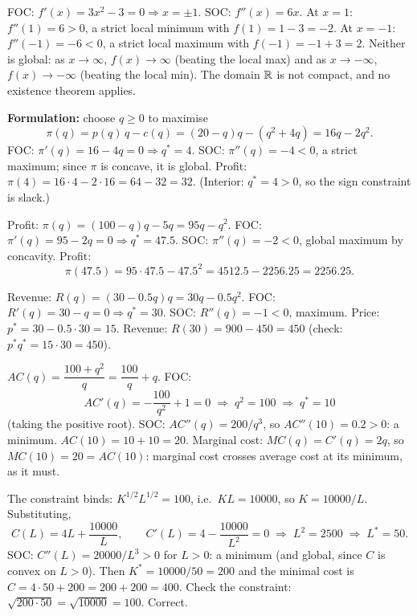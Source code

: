 \begin{solutions}
  \item FOC: $f'(x)=3x^{2}-3=0 \Rightarrow x=\pm 1$. SOC:
        $f''(x)=6x$. At $x=1$: $f''(1)=6>0$, a strict local minimum
        with $f(1)=1-3=-2$. At $x=-1$: $f''(-1)=-6<0$, a strict local
        maximum with $f(-1)=-1+3=2$. Neither is global: as
        $x\to\infty$, $f(x)\to\infty$ (beating the local max) and as
        $x\to-\infty$, $f(x)\to-\infty$ (beating the local min). The
        domain $\mathbb{R}$ is not compact, and no existence theorem applies.

  \item \textbf{Formulation:} choose $q\ge 0$ to maximise
        \[
          \pi(q)=p(q)\,q-c(q)=(20-q)q-(q^{2}+4q)=16q-2q^{2}.
        \]
        FOC: $\pi'(q)=16-4q=0 \Rightarrow q^{*}=4$. SOC:
        $\pi''(q)=-4<0$, a strict maximum; since $\pi$ is concave, it
        is global. Profit:
        $\pi(4)=16\cdot 4-2\cdot 16=64-32=32$. (Interior: $q^{*}=4>0$,
        so the sign constraint is slack.)

  \item Profit: $\pi(q)=(100-q)q-5q=95q-q^{2}$. FOC:
        $\pi'(q)=95-2q=0 \Rightarrow q^{*}=47.5$. SOC:
        $\pi''(q)=-2<0$, global maximum by concavity. Profit:
        \[
          \pi(47.5)=95\cdot 47.5-47.5^{2}=4512.5-2256.25=2256.25 .
        \]

  \item Revenue: $R(q)=(30-0.5q)q=30q-0.5q^{2}$. FOC:
        $R'(q)=30-q=0 \Rightarrow q^{*}=30$. SOC: $R''(q)=-1<0$,
        maximum. Price: $p^{*}=30-0.5\cdot 30=15$. Revenue:
        $R(30)=900-450=450$ (check: $p^{*}q^{*}=15\cdot 30=450$).

  \item $AC(q)=\dfrac{100+q^{2}}{q}=\dfrac{100}{q}+q$. FOC:
        \[
          AC'(q)=-\frac{100}{q^{2}}+1=0
          \;\Rightarrow\; q^{2}=100 \;\Rightarrow\; q^{*}=10
        \]
        (taking the positive root). SOC:
        $AC''(q)=200/q^{3}$, so $AC''(10)=0.2>0$: a minimum.
        $AC(10)=10+10=20$. Marginal cost: $MC(q)=C'(q)=2q$, so
        $MC(10)=20=AC(10)$: marginal cost crosses average cost at
        its minimum, as it must.

  \item The constraint binds: $K^{1/2}L^{1/2}=100$, i.e.\
        $KL=10000$, so $K=10000/L$. Substituting,
        \[
          C(L)=4L+\frac{10000}{L}, \qquad
          C'(L)=4-\frac{10000}{L^{2}}=0
          \;\Rightarrow\; L^{2}=2500 \;\Rightarrow\; L^{*}=50 .
        \]
        SOC: $C''(L)=20000/L^{3}>0$ for $L>0$: a minimum (and global,
        since $C$ is convex on $L>0$). Then
        $K^{*}=10000/50=200$ and the minimal cost is
        $C=4\cdot 50+200=200+200=400$. Check the constraint:
        $\sqrt{200\cdot 50}=\sqrt{10000}=100$. Correct.


\end{solutions}
